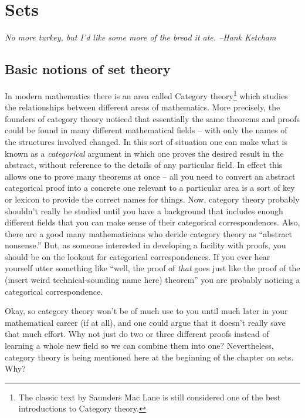  
\chapter{Sets}
\label{ch:sets}

{\em No more turkey, but I'd like some more of the bread it ate. --Hank Ketcham}


\section{Basic notions of set theory}
\label{sec:basic_set_notions}

In modern mathematics there is an area called  
Category theory\footnote{The classic text by Saunders Mac Lane \cite{macl} %
is still considered one of the best introductions to Category theory.} 
which studies the 
relationships between different areas of mathematics.  More precisely,
the founders of category theory noticed that essentially the same theorems 
and proofs could be found in many different mathematical fields -- with
only the names of the structures involved changed.  In this sort of
situation one can make what is known as a \emph{categorical} argument
in which one proves the desired result in the abstract, without reference
to the details of any particular field.  In effect this allows one
to prove many theorems at once -- all you need to convert an abstract
categorical proof into a concrete one relevant to a particular area
is a sort of key or lexicon to provide the correct names for things.
Now, category theory probably shouldn't really be studied until you 
have a background that includes enough different fields that you can
make sense of their categorical correspondences.  Also, there are 
a good many mathematicians who deride category theory as 
``abstract nonsense.''   But, as someone interested in developing a facility
with proofs, you should be on the lookout for categorical correspondences.
If you ever hear yourself utter something like ``well, the proof of 
\emph{that} goes just like the proof of the 
(insert weird technical-sounding name here) theorem'' you are  
probably noticing a categorical correspondence.  

Okay, so category theory won't be of much
use to you until much later in your mathematical career (if at all), and 
one could argue that it doesn't really save that much effort.  Why not just do two or three different 
proofs instead of learning a whole new field so we can combine 
them into one?  Nevertheless, category theory is being
mentioned here at the beginning of the chapter on sets.  Why? 


